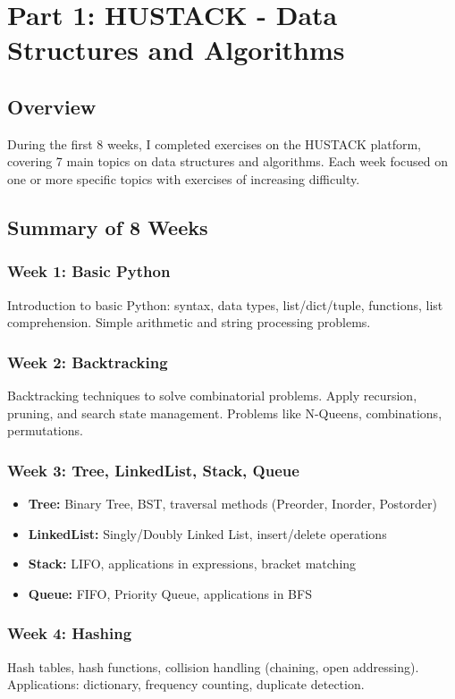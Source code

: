\documentclass[12pt,a4paper]{article}
\begin{document}
\newpage
\section{Part 1: HUSTACK - Data Structures and Algorithms}

\subsection{Overview}
During the first 8 weeks, I completed exercises on the HUSTACK platform, covering 7 main topics on data structures and algorithms. Each week focused on one or more specific topics with exercises of increasing difficulty.

\subsection{Summary of 8 Weeks}

\subsubsection{Week 1: Basic Python}
Introduction to basic Python: syntax, data types, list/dict/tuple, functions, list comprehension. Simple arithmetic and string processing problems.

\subsubsection{Week 2: Backtracking}
Backtracking techniques to solve combinatorial problems. Apply recursion, pruning, and search state management. Problems like N-Queens, combinations, permutations.

\subsubsection{Week 3: Tree, LinkedList, Stack, Queue}
\begin{itemize}
    \item \textbf{Tree:} Binary Tree, BST, traversal methods (Preorder, Inorder, Postorder)
    \item \textbf{LinkedList:} Singly/Doubly Linked List, insert/delete operations
    \item \textbf{Stack:} LIFO, applications in expressions, bracket matching
    \item \textbf{Queue:} FIFO, Priority Queue, applications in BFS
\end{itemize}

\subsubsection{Week 4: Hashing}
Hash tables, hash functions, collision handling (chaining, open addressing). Applications: dictionary, frequency counting, duplicate detection.
\end{document}
